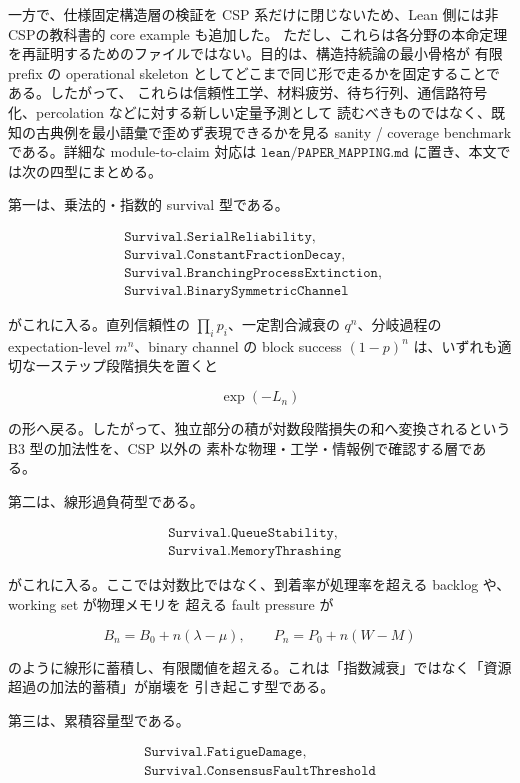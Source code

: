 \documentclass[12pt,a4paper]{article}
\begin{document}
一方で、仕様固定構造層の検証を CSP 系だけに閉じないため、Lean 側には非CSPの教科書的 core example も追加した。 ただし、これらは各分野の本命定理を再証明するためのファイルではない。目的は、構造持続論の最小骨格が 有限 prefix の operational skeleton としてどこまで同じ形で走るかを固定することである。したがって、 これらは信頼性工学、材料疲労、待ち行列、通信路符号化、percolation などに対する新しい定量予測として 読むべきものではなく、既知の古典例を最小語彙で歪めず表現できるかを見る sanity / coverage benchmark である。詳細な module-to-claim 対応は \(\texttt{lean/PAPER\_MAPPING.md}\) に置き、本文では次の四型にまとめる。

第一は、乗法的・指数的 survival 型である。

\[
\begin{aligned}
\texttt{Survival.SerialReliability},\quad \\
\texttt{Survival.ConstantFractionDecay},\quad \\
\texttt{Survival.BranchingProcessExtinction},\quad \\
\texttt{Survival.BinarySymmetricChannel}
\end{aligned}
\]

がこれに入る。直列信頼性の \(\prod_{i} p_{i}\)、一定割合減衰の \(q^n\)、分岐過程の expectation-level \(m^n\)、binary channel の block success \((1-p)^n\) は、いずれも適切な一ステップ段階損失を置くと

\[
\exp(-L_{n})
\]

の形へ戻る。したがって、独立部分の積が対数段階損失の和へ変換されるという B3 型の加法性を、CSP 以外の 素朴な物理・工学・情報例で確認する層である。

第二は、線形過負荷型である。

\[
\begin{aligned}
\texttt{Survival.QueueStability},\quad \\
\texttt{Survival.MemoryThrashing}
\end{aligned}
\]

がこれに入る。ここでは対数比ではなく、到着率が処理率を超える backlog や、working set が物理メモリを 超える fault pressure が

\[
B_{n}=B_0+n(\lambda-\mu),\qquad P_{n}=P_0+n(W-M)
\]

のように線形に蓄積し、有限閾値を超える。これは「指数減衰」ではなく「資源超過の加法的蓄積」が崩壊を 引き起こす型である。

第三は、累積容量型である。

\[
\begin{aligned}
\texttt{Survival.FatigueDamage},\quad \\
\texttt{Survival.ConsensusFaultThreshold}
\end{aligned}
\]
\end{document}
